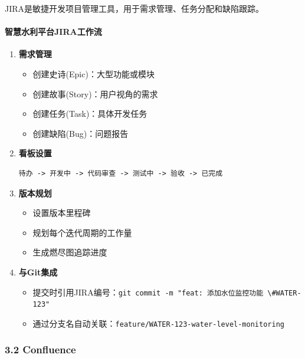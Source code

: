 JIRA是敏捷开发项目管理工具，用于需求管理、任务分配和缺陷跟踪。

\paragraph{智慧水利平台JIRA工作流}\label{ux667aux6167ux6c34ux5229ux5e73ux53f0jiraux5de5ux4f5cux6d41}

\begin{enumerate}
\def\labelenumi{\arabic{enumi}.}
\item
  \textbf{需求管理}

  \begin{itemize}
  \tightlist
  \item
    创建史诗(Epic)：大型功能或模块
  \item
    创建故事(Story)：用户视角的需求
  \item
    创建任务(Task)：具体开发任务
  \item
    创建缺陷(Bug)：问题报告
  \end{itemize}
\item
  \textbf{看板设置}

\begin{lstlisting}
待办 -> 开发中 -> 代码审查 -> 测试中 -> 验收 -> 已完成
\end{lstlisting}
\item
  \textbf{版本规划}

  \begin{itemize}
  \tightlist
  \item
    设置版本里程碑
  \item
    规划每个迭代周期的工作量
  \item
    生成燃尽图追踪进度
  \end{itemize}
\item
  \textbf{与Git集成}

  \begin{itemize}
  \tightlist
  \item
    提交时引用JIRA编号：\passthrough{\lstinline!git commit -m "feat: 添加水位监控功能 \#WATER-123"!}
  \item
    通过分支名自动关联：\passthrough{\lstinline!feature/WATER-123-water-level-monitoring!}
  \end{itemize}
\end{enumerate}

\subsubsection{3.2 Confluence}\label{confluence}

